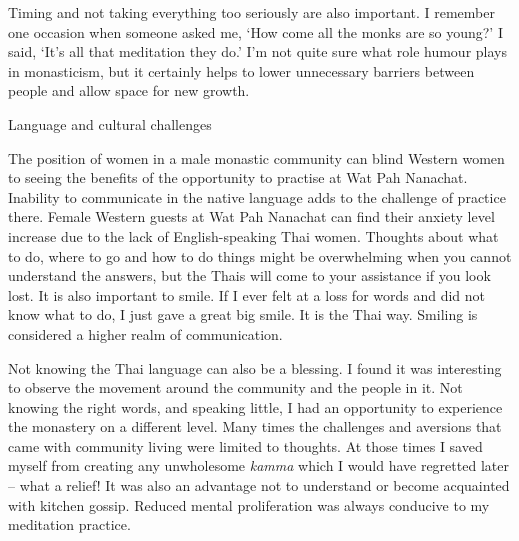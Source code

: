 Timing and not taking everything too seriously are also important. I
remember one occasion when someone asked me, `How come all the monks are
so young?' I said, `It's all that meditation they do.' I'm not quite
sure what role humour plays in monasticism, but it certainly helps to
lower unnecessary barriers between people and allow space for new
growth. 

Language and cultural challenges

The position of women in a male monastic community can blind Western
women to seeing the benefits of the opportunity to practise at Wat Pah
Nanachat. Inability to communicate in the native language adds to the
challenge of practice there. Female Western guests at Wat Pah Nanachat
can find their anxiety level increase due to the lack of
English-speaking Thai women. Thoughts about what to do, where to go and
how to do things might be overwhelming when you cannot understand the
answers, but the Thais will come to your assistance if you look lost. It
is also important to smile. If I ever felt at a loss for words and did
not know what to do, I just gave a great big smile. It is the Thai way. 
Smiling is considered a higher realm of communication. 

Not knowing the Thai language can also be a blessing. I found it was
interesting to observe the movement around the community and the people
in it. Not knowing the right words, and speaking little, I had an
opportunity to experience the monastery on a different level. Many times
the challenges and aversions that came with community living were
limited to thoughts. At those times I saved myself from creating any
unwholesome \emph{kamma} which I would have regretted later -- what a
relief! It was also an advantage not to understand or become acquainted
with kitchen gossip. Reduced mental proliferation was always conducive
to my meditation practice. 

